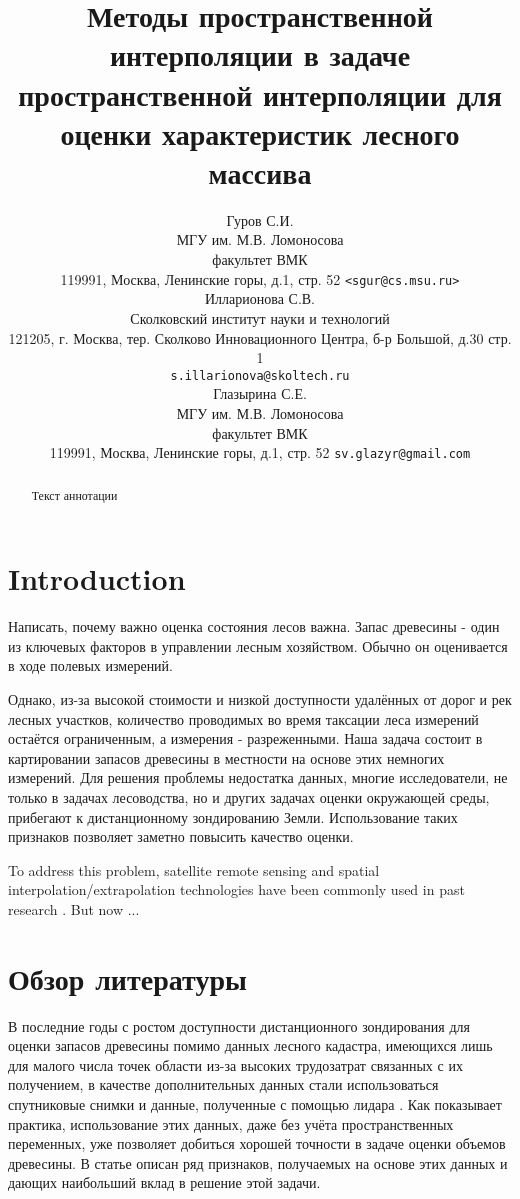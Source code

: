 \documentclass{article}
\title{Методы пространственной интерполяции в задаче пространственной интерполяции для оценки характеристик лесного массива}
\author{Гуров С.И.\\
	МГУ им. М.В. Ломоносова\\
	факультет ВМК\\
        119991, Москва, Ленинские горы, д.1, стр. 52
	\texttt{<sgur@cs.msu.ru>} \\
	\And
	  Илларионова С.В.\\
	  Сколковский институт науки и технологий\\
	121205, г. Москва, тер. Сколково Инновационного Центра, б-р Большой, д.30 стр. 1\\
	\texttt{s.illarionova@skoltech.ru} \\
    \And
    Глазырина С.Е. \\
	МГУ им. М.В. Ломоносова\\
	факультет ВМК\\
        119991, Москва, Ленинские горы, д.1, стр. 52
	\texttt{sv.glazyr@gmail.com} \\
}
\date{}
\begin{document}
\maketitle

\begin{abstract}
	Текст аннотации
    
\end{abstract}



\section{Introduction}
Написать, почему важно оценка состояния лесов важна.
Запас древесины - один из ключевых факторов в управлении лесным хозяйством. Обычно он оценивается в ходе полевых измерений.

Однако, из-за высокой стоимости и низкой доступности удалённых от дорог и рек лесных участков, количество проводимых во время таксации леса измерений остаётся ограниченным, а измерения - разреженными. Наша задача состоит в картировании запасов древесины в местности на основе этих немногих измерений. Для решения проблемы недостатка данных, многие исследователи, не только в задачах лесоводства, но и других задачах оценки окружающей среды, прибегают к дистанционному зондированию Земли. Использование таких признаков позволяет заметно повысить качество оценки.

To address this problem, satellite remote sensing and spatial interpolation/extrapolation technologies have been commonly used in past research \citep{}. But now ...

\section{Обзор литературы}

В последние годы с ростом доступности дистанционного зондирования для оценки запасов древесины помимо данных лесного кадастра, имеющихся лишь для малого числа точек области из-за высоких трудозатрат связанных с их получением, в качестве дополнительных данных стали использоваться спутниковые снимки и данные, полученные с помощью лидара \citep{maack2016modelling}. Как показывает практика, использование этих данных, даже без учёта пространственных переменных, уже позволяет добиться хорошей точности в задаче оценки объемов древесины. В статье \cite{sanchez2019growing} описан ряд признаков, получаемых на основе этих данных и дающих наибольший вклад в решение этой задачи.
\end{document}
